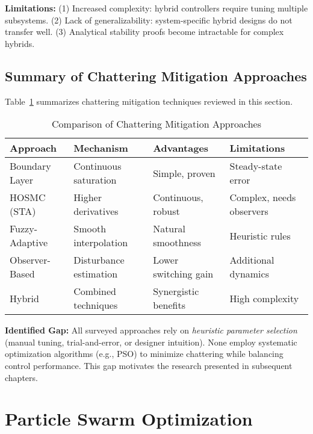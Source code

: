 \textbf{Limitations:} (1) Increased complexity: hybrid controllers require tuning multiple subsystems. (2) Lack of generalizability: system-specific hybrid designs do not transfer well. (3) Analytical stability proofs become intractable for complex hybrids.

\subsection{Summary of Chattering Mitigation Approaches}

Table~\ref{tab:chattering_approaches} summarizes chattering mitigation techniques reviewed in this section.

\begin{table}[t]
\centering
\caption{Comparison of Chattering Mitigation Approaches}
\label{tab:chattering_approaches}
\begin{tabular}{llll}
\toprule
\textbf{Approach} & \textbf{Mechanism} & \textbf{Advantages} & \textbf{Limitations} \\
\midrule
Boundary Layer & Continuous saturation & Simple, proven & Steady-state error \\
HOSMC (STA) & Higher derivatives & Continuous, robust & Complex, needs observers \\
Fuzzy-Adaptive & Smooth interpolation & Natural smoothness & Heuristic rules \\
Observer-Based & Disturbance estimation & Lower switching gain & Additional dynamics \\
Hybrid & Combined techniques & Synergistic benefits & High complexity \\
\bottomrule
\end{tabular}
\end{table}

\textbf{Identified Gap:} All surveyed approaches rely on \emph{heuristic parameter selection} (manual tuning, trial-and-error, or designer intuition). None employ systematic optimization algorithms (e.g., PSO) to minimize chattering while balancing control performance. This gap motivates the research presented in subsequent chapters.

\section{Particle Swarm Optimization}
\label{sec:pso_optimization}

